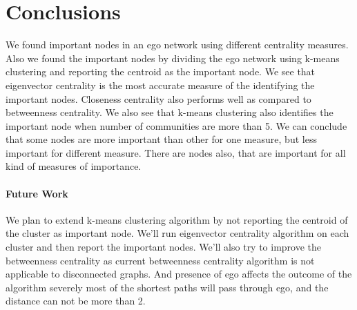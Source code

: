 \section{Conclusions}
\label{conc}

%
%
%

We found important nodes in an ego network using different centrality
measures.  Also we found the important nodes by dividing the ego
network using k-means clustering and reporting the centroid as the
important node.  We see that eigenvector centrality is the most
accurate measure of the identifying the important nodes.  Closeness
centrality also performs well as compared to betweenness centrality.
We also see that k-means clustering also identifies the important node
when number of communities are more than 5.  We can conclude that some
nodes are more important than other for one measure, but less
important for different measure.  There are nodes also, that are
important for all kind of measures of importance.

\paragraph{Future Work}
We plan to extend k-means clustering algorithm by not reporting the
centroid of the cluster as important node.  We'll run eigenvector
centrality algorithm on each cluster and then report the important
nodes.  We'll also try to improve the betweenness centrality as
current betweenness centrality algorithm is not applicable to
disconnected graphs.  And presence of ego affects the outcome of the
algorithm severely most of the shortest paths will pass through ego,
and the distance can not be more than 2.

%
%
%
%
%
%
%

